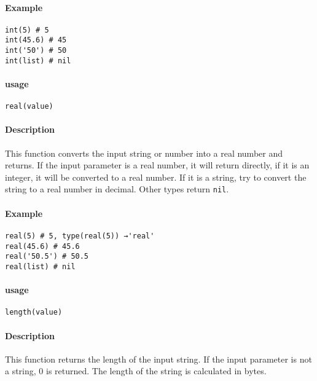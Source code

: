 \paragraph{Example}
\begin{lstlisting}[language=berry, numbers=none]
int(5) # 5
int(45.6) # 45
int('50') # 50
int(list) # nil
\end{lstlisting}


\paragraph{usage}
\begin{lstlisting}[language=berry, numbers=none]
real(value)
\end{lstlisting}

\paragraph{Description}
This function converts the input string or number into a real number and returns. If the input parameter is a real number, it will return directly, if it is an integer, it will be converted to a real number. If it is a string, try to convert the string to a real number in decimal. Other types return \texttt{nil}.

\paragraph{Example}
\begin{lstlisting}[language=berry, numbers=none]
real(5) # 5, type(real(5)) →'real'
real(45.6) # 45.6
real('50.5') # 50.5
real(list) # nil
\end{lstlisting}


\paragraph{usage}
\begin{lstlisting}[language=berry, numbers=none]
length(value)
\end{lstlisting}

\paragraph{Description}
This function returns the length of the input string. If the input parameter is not a string, 0 is returned. The length of the string is calculated in bytes.

